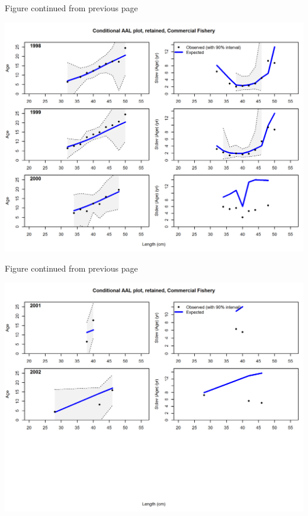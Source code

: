 \documentclass[12pt,]{article}
\begin{document}
\begin{center} 

            Figure continued from previous page 

            \end{center}

\includegraphics{./r4ss/plots_mod2/comp_condAALfit_Andre_plotsflt2mkt2_page7.png}

\begin{center} 

            Figure continued from previous page 

            \end{center}

\includegraphics{./r4ss/plots_mod2/comp_condAALfit_Andre_plotsflt2mkt2_page8.png}
\end{document}
